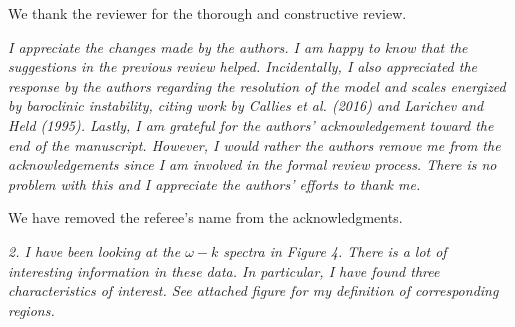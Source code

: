 \documentclass[11pt]{article}
\newcommand{\bdp}{\begin{description}}
\newcommand{\edp}{\end{description}}
\begin{document}
\bdp
   \item We thank the reviewer for the thorough and constructive review.
\edp

\begin{enumerate}
 \item {\it I appreciate the changes made by the authors. I am happy to know that the suggestions in
the previous review helped. Incidentally, I also appreciated the response by the authors
regarding the resolution of the model and scales energized by baroclinic instability, citing
work by Callies et al. (2016) and Larichev and Held (1995). Lastly, I am grateful for the
authors’ acknowledgement toward the end of the manuscript. However, I would rather the
authors remove me from the acknowledgements since I am involved in the formal review
process. There is no problem with this and I appreciate the authors’ efforts to thank me.}

\bdp
   \item We have removed the referee's name from the acknowledgments.
\edp

\item {\it 2. I have been looking at the $\omega-k$ spectra in Figure 4. There is a lot of interesting
information in these data. In particular, I have found three characteristics of interest. See
attached figure for my definition of corresponding regions.}




\end{enumerate}
\end{document}

